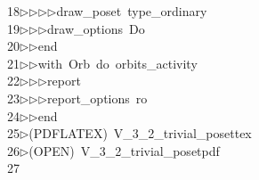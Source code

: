 \begin{tabbing}
18\>$\triangleright$\>$\triangleright$\>$\triangleright$\>$\triangleright$\>draw\_poset\ type\_ordinary\ \\[0pt]
19\>$\triangleright$\>$\triangleright$\>$\triangleright$\>draw\_options\ Do\ \\[0pt]
20\>$\triangleright$\>$\triangleright$\>end\ \\[0pt]
21\>$\triangleright$\>$\triangleright$\>with\ Orb\ do\ orbits\_activity\ \\[0pt]
22\>$\triangleright$\>$\triangleright$\>$\triangleright$\>report\ \ \\[0pt]
23\>$\triangleright$\>$\triangleright$\>$\triangleright$\>report\_options\ ro\ \\[0pt]
24\>$\triangleright$\>$\triangleright$\>end\ \\[0pt]
25\>$\triangleright$\>(PDFLATEX)\ V\_3\_2\_trivial\_posettex\\[0pt]
26\>$\triangleright$\>(OPEN)\ V\_3\_2\_trivial\_posetpdf\\[0pt]
27\>\end{tabbing}
